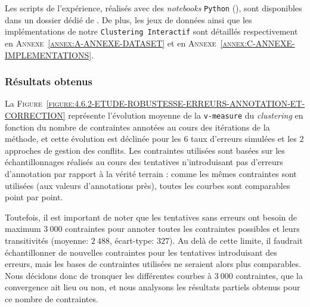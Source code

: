 			\begin{leftBarInformation}
				Les scripts de l'expérience, réalisés avec des \textit{notebooks} \texttt{Python} (\cite{van-rossum-drake:2009:python-reference-manual}), sont disponibles dans un dossier dédié de \cite{schild:2021:cognitivefactory-interactiveclusteringcomparativestudy}.
				De plus, les jeux de données ainsi que les implémentations de notre \texttt{Clustering Interactif} sont détaillés respectivement en \textsc{Annexe~\ref{annex:A-ANNEXE-DATASET}} et en \textsc{Annexe~\ref{annex:C-ANNEXE-IMPLEMENTATIONS}}.
			\end{leftBarInformation}

		\subsubsection{Résultats obtenus}
		
			La \textsc{Figure~\ref{figure:4.6.2-ETUDE-ROBUSTESSE-ERREURS-ANNOTATION-ET-CORRECTION}} représente l'évolution moyenne de la \texttt{v-measure} du \textit{clustering} en fonction du nombre de contraintes annotées au cours des itérations de la méthode, et cette évolution est déclinée pour les $6$ taux d'erreurs simulées et les $2$ approches de gestion des conflits.
			Les contraintes utilisées sont basées sur les échantillonnages réalisés au cours des tentatives n'introduisant pas d'erreurs d'annotation par rapport à la vérité terrain : comme les mêmes contraintes sont utilisées (aux valeurs d'annotations près), toutes les courbes sont comparables point par point.
			
			\begin{leftBarWarning}
				Toutefois, il est important de noter que les tentatives sans erreurs ont besoin de maximum $3~000$ contraintes pour annoter toutes les contraintes possibles et leurs transitivités (moyenne: $2~488$, écart-type: $327$).
				Au delà de cette limite, il faudrait échantillonner de nouvelles contraintes pour les tentatives introduisant des erreurs, mais les bases de contraintes utilisées ne seraient alors plus comparables.
				Nous décidons donc de tronquer les différentes courbes à $3~000$ contraintes, que la convergence ait lieu ou non, et nous analysons les résultats partiels obtenus pour ce nombre de contraintes.
			\end{leftBarWarning}
			
